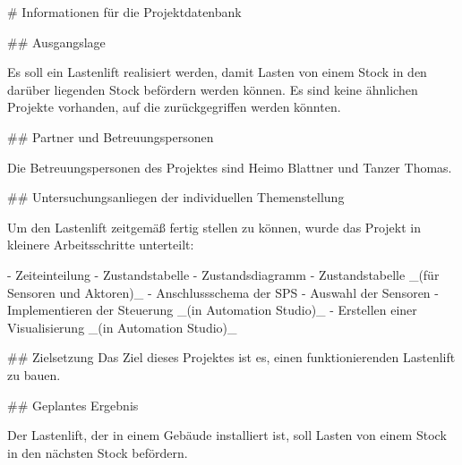 \begin{markdown}
# Informationen für die Projektdatenbank

## Ausgangslage

Es soll ein Lastenlift realisiert werden, damit Lasten von einem Stock in den darüber liegenden Stock befördern werden können. Es sind keine ähnlichen Projekte vorhanden, auf die zurückgegriffen werden könnten.

## Partner und Betreuungspersonen

Die Betreuungspersonen des Projektes sind Heimo Blattner und Tanzer Thomas.

## Untersuchungsanliegen der individuellen Themenstellung

Um den Lastenlift zeitgemäß fertig stellen zu können, wurde das Projekt in kleinere Arbeitsschritte unterteilt:

- Zeiteinteilung
- Zustandstabelle
- Zustandsdiagramm
- Zustandstabelle _(für Sensoren und Aktoren)_
- Anschlussschema der SPS
- Auswahl der Sensoren
- Implementieren der Steuerung _(in Automation Studio)_
- Erstellen einer Visualisierung _(in Automation Studio)_

## Zielsetzung
Das Ziel dieses Projektes ist es, einen funktionierenden Lastenlift zu bauen.

## Geplantes Ergebnis

Der Lastenlift, der in einem Gebäude installiert ist, soll Lasten von einem Stock in den nächsten Stock befördern.
\end{markdown}
